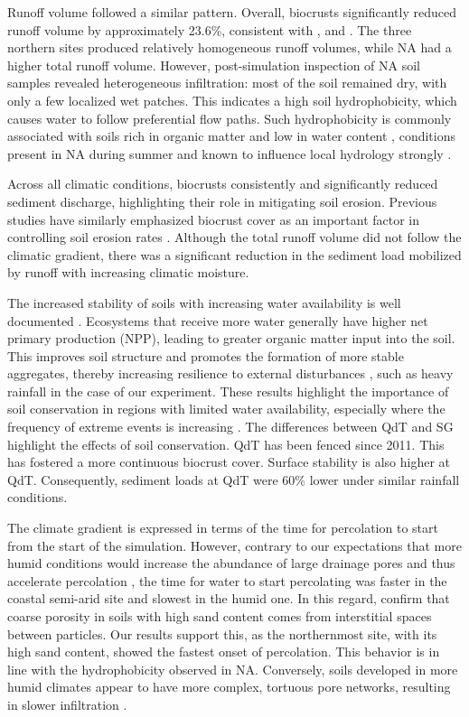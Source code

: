 Runoff volume followed a similar pattern. Overall, biocrusts significantly reduced runoff volume by approximately 23.6\%, consistent with \citet{Bu2015}, \citet{Gall2022b} and \citet{Xiao2022}. The three northern sites produced relatively homogeneous runoff volumes, while NA had a higher total runoff volume. However, post-simulation inspection of NA soil samples revealed heterogeneous infiltration: most of the soil remained dry, with only a few localized wet patches. This indicates a high soil hydrophobicity, which causes water to follow preferential flow paths. Such hydrophobicity is commonly associated with soils rich in organic matter and low in water content \citep{JimenezMorillo2022,Xing2023}, conditions present in NA during summer and known to influence local hydrology strongly \citep{Hassan2022}.

Across all climatic conditions, biocrusts consistently and significantly reduced sediment discharge, highlighting their role in mitigating soil erosion. Previous studies have similarly emphasized biocrust cover as an important factor in controlling soil erosion rates \citep{Chamizo2017,Gall2022b,Seitz2017,Silva2019}. Although the total runoff volume did not follow the climatic gradient, there was a significant reduction in the sediment load mobilized by runoff with increasing climatic moisture.

The increased stability of soils with increasing water availability is well documented \citep{Lal2020,RiverasMunoz2022}. Ecosystems that receive more water generally have higher net primary production (NPP), leading to greater organic matter input into the soil. This improves soil structure and promotes the formation of more stable aggregates, thereby increasing resilience to external disturbances \citep{Lal2020}, such as heavy rainfall in the case of our experiment. These results highlight the importance of soil conservation in regions with limited water availability, especially where the frequency of extreme events is increasing \citep{MeseguerRuiz2020}. The differences between QdT and SG highlight the effects of soil conservation. QdT has been fenced since 2011. This has fostered a more continuous biocrust cover. Surface stability is also higher at QdT. Consequently, sediment loads at QdT were 60\% lower under similar rainfall conditions.

The climate gradient is expressed in terms of the time for percolation to start from the start of the simulation. However, contrary to our expectations that more humid conditions would increase the abundance of large drainage pores and thus accelerate percolation \citep{RiverasMunoz2022}, the time for water to start percolating was faster in the coastal semi-arid site and slowest in the humid one. In this regard, \citet{Nielsen2018} confirm that coarse porosity in soils with high sand content comes from interstitial spaces between particles. Our results support this, as the northernmost site, with its high sand content, showed the fastest onset of percolation. This behavior is in line with the hydrophobicity observed in NA. Conversely, soils developed in more humid climates appear to have more complex, tortuous pore networks, resulting in slower infiltration \citep{Crawford2006}.

